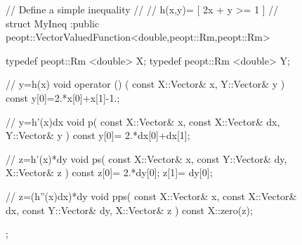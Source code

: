 \begin{figure}
    \ContinuedFloat
    \begin{lstCpp}
// Define a simple inequality
//
// h(x,y)= [ 2x + y >= 1 ] 
//
struct MyIneq
    :public peopt::VectorValuedFunction<double,peopt::Rm,peopt::Rm>
{
    typedef peopt::Rm <double> X;
    typedef peopt::Rm <double> Y;
    
    // y=h(x) 
    void operator () (
        const X::Vector& x,
        Y::Vector& y
    ) const {
        y[0]=2.*x[0]+x[1]-1.;
    }
    
    // y=h'(x)dx
    void p(
        const X::Vector& x,
        const X::Vector& dx,
        Y::Vector& y
    ) const { 
        y[0]= 2.*dx[0]+dx[1];
    }
    
    // z=h'(x)*dy
    void ps(
        const X::Vector& x,
        const Y::Vector& dy,
        X::Vector& z
    ) const { 
        z[0]= 2.*dy[0];
        z[1]= dy[0];
    }
    
    // z=(h''(x)dx)*dy
    void pps( 
        const X::Vector& x,
        const X::Vector& dx,
        const Y::Vector& dy,
        X::Vector& z
    ) const {
        X::zero(z);
    }
};
\end{lstCpp}
\end{figure}
